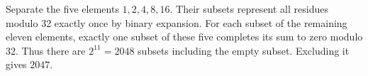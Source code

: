 Separate the five elements $1,2,4,8,16$. Their subsets represent all residues modulo 32 exactly once by binary expansion. For each subset of the remaining eleven elements, exactly one subset of these five completes its sum to zero modulo 32. Thus there are $2^{11}=2048$ subsets including the empty subset. Excluding it gives $\boxed{2047}$.
